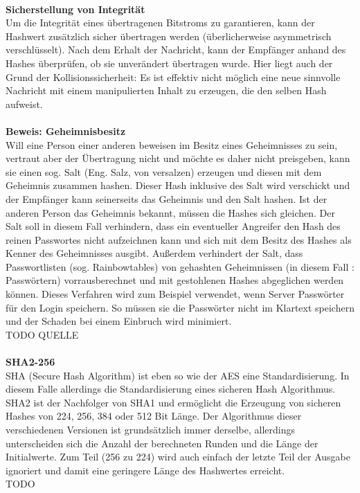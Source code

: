 \documentclass[13pt,a4paper,bibliography=totocnumbered,listof=totocnumbered]{scrartcl}
\begin{document}
\\\textbf{Sicherstellung von Integrität}\\
Um die Integrität eines übertragenen Bitstroms zu garantieren, kann der Hashwert zusätzlich sicher übertragen werden (überlicherweise asymmetrisch verschlüsselt). Nach dem Erhalt der Nachricht, kann der Empfänger anhand des Hashes überprüfen, ob sie unverändert übertragen wurde. Hier liegt auch der Grund der Kollisionssicherheit: Es ist effektiv nicht möglich eine neue sinnvolle Nachricht mit einem manipulierten Inhalt zu erzeugen, die den selben Hash aufweist.\\
\\\textbf{Beweis: Geheimnisbesitz}\\
Will eine Person einer anderen beweisen im Besitz eines Geheimnisses zu sein, vertraut aber der Übertragung nicht und möchte es daher nicht preisgeben, kann sie einen sog. Salt (Eng. Salz, von versalzen) erzeugen und diesen mit dem Geheimnis zusammen hashen. Dieser Hash inklusive des Salt wird verschickt und der Empfänger kann seinerseits das Geheimnis und den Salt hashen. Ist der anderen Person das Geheimnis bekannt, müssen die Hashes sich gleichen. Der Salt soll in diesem Fall verhindern, dass ein eventueller Angreifer den Hash des reinen Passwortes nicht aufzeichnen kann und sich mit dem Besitz des Hashes als Kenner des Geheimnisses ausgibt. Außerdem verhindert der Salt, dass Passwortlisten (sog. Rainbowtables) von gehashten Geheimnissen (in diesem Fall : Passwörtern) vorrausberechnet und mit gestohlenen Hashes abgeglichen werden können. Dieses Verfahren wird zum Beispiel verwendet, wenn Server Passwörter für den Login speichern. So müssen sie die Passwörter nicht im Klartext speichern und der Schaden bei einem Einbruch wird minimiert.\\
TODO QUELLE\\
\\\textbf{SHA2-256}\\
SHA (Secure Hash Algorithm) ist eben so wie der AES eine Standardisierung. In diesem Falle allerdings die Standardisierung eines sicheren Hash Algorithmus. SHA2 ist der Nachfolger von SHA1 und ermöglicht die Erzeugung von sicheren Hashes von 224, 256, 384 oder 512 Bit Länge. Der Algorithmus dieser verschiedenen Versionen ist grundsätzlich immer derselbe, allerdings unterscheiden sich die Anzahl der berechneten Runden und die Länge der Initialwerte. Zum Teil (256 zu 224) wird auch einfach der letzte Teil der Ausgabe ignoriert und damit eine geringere Länge des Hashwertes erreicht.\\
\cite{10}\cite{13} TODO
\end{document}
